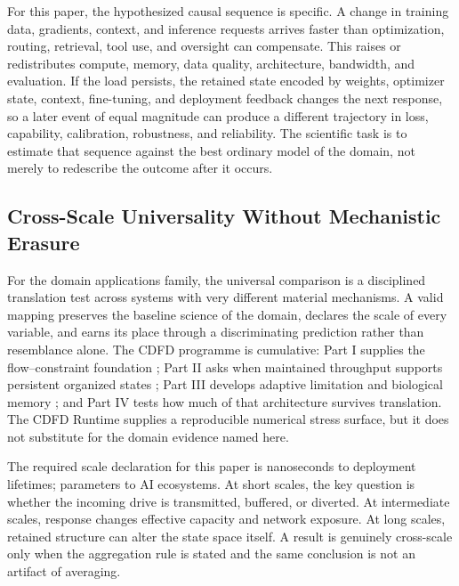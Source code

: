 \documentclass[12pt,a4paper]{article}
\begin{document}
For this paper, the hypothesized causal sequence is specific. A change in
training data, gradients, context, and inference requests arrives faster than optimization, routing, retrieval, tool use, and oversight can compensate.
This raises or redistributes compute, memory, data quality, architecture, bandwidth, and evaluation. If the load persists,
the retained state encoded by weights, optimizer state, context, fine-tuning, and deployment feedback changes the next response, so a later event of equal
magnitude can produce a different trajectory in loss, capability, calibration, robustness, and reliability. The
scientific task is to estimate that sequence against the best ordinary model of
the domain, not merely to redescribe the outcome after it occurs.

\subsection{Cross-Scale Universality Without Mechanistic Erasure}

For the domain applications family, the universal comparison is a disciplined translation test across systems with very different material mechanisms. A valid mapping preserves the baseline science of the domain, declares the scale of every variable, and earns its place through a discriminating prediction rather than resemblance alone. \cite{Holling1973,Turing1952,Shannon1948,BakTangWiesenfeld1987}
The CDFD programme is cumulative: Part I supplies the flow--constraint
foundation \cite{MujjabiPartI2026}; Part II asks when maintained throughput
supports persistent organized states \cite{MujjabiPartII2026}; Part III
develops adaptive limitation and biological memory \cite{MujjabiPartIII2026};
and Part IV \cite{MujjabiPartIV2026} tests how much of that architecture
survives translation. The CDFD Runtime \cite{CDFDRuntime2026} supplies a
reproducible numerical stress surface, but it does not substitute for the
domain evidence named here.

The required scale declaration for this paper is nanoseconds to deployment lifetimes; parameters to AI ecosystems. At short
scales, the key question is whether the incoming drive is transmitted,
buffered, or diverted. At intermediate scales, response changes effective
capacity and network exposure. At long scales, retained structure can alter the
state space itself. A result is genuinely cross-scale only when the aggregation
rule is stated and the same conclusion is not an artifact of averaging.
\end{document}
